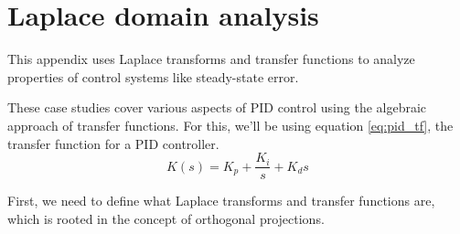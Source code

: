 
\chapter{Laplace domain analysis}
\label{ch:laplace-domain-analysis}

This appendix uses Laplace transforms and transfer functions to analyze
properties of control systems like \gls{steady-state error}.

These case studies cover various aspects of PID control using the algebraic
approach of transfer functions. For this, we'll be using equation
\eqref{eq:pid_tf}, the transfer function for a PID controller.
\begin{equation}
  K(s) = K_p + \frac{K_i}{s} + K_ds \label{eq:pid_tf}
\end{equation}

First, we need to define what Laplace transforms and transfer functions are,
which is rooted in the concept of orthogonal projections.

\renewcommand*{\chapterpath}{\partpath/laplace-domain-analysis}






